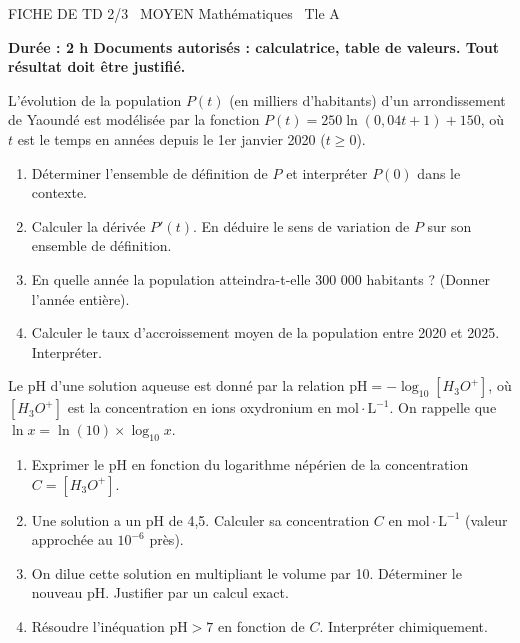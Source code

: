 \documentclass[11pt]{article}
\begin{document}
\begin{tcolorbox}[enhanced,colback=popink,colframe=popink,arc=10pt,boxrule=0pt,left=12pt,right=12pt,top=9pt,bottom=9pt]
{\color{white}\popxbold\small FICHE DE TD 2/3 \textbullet\ MOYEN \hfill Mathématiques \textbullet\ Tle A\par}
\end{tcolorbox}
\vspace{4pt}
\textbf{Durée : 2 h \quad Documents autorisés : calculatrice, table de valeurs. \quad Tout résultat doit être justifié.}

\begin{exercice}
L'évolution de la population $P(t)$ (en milliers d'habitants) d'un arrondissement de Yaoundé est modélisée par la fonction $P(t) = 250 \ln(0,04t + 1) + 150$, où $t$ est le temps en années depuis le 1er janvier 2020 ($t \geq 0$).
\begin{enumerate}
    \item Déterminer l'ensemble de définition de $P$ et interpréter $P(0)$ dans le contexte.
    \item Calculer la dérivée $P'(t)$. En déduire le sens de variation de $P$ sur son ensemble de définition.
    \item En quelle année la population atteindra-t-elle 300 000 habitants ? (Donner l'année entière).
    \item Calculer le taux d'accroissement moyen de la population entre 2020 et 2025. Interpréter.
\end{enumerate}
\end{exercice}

\begin{exercice}
Le pH d'une solution aqueuse est donné par la relation $\text{pH} = -\log_{10}[H_3O^+]$, où $[H_3O^+]$ est la concentration en ions oxydronium en $\text{mol}\cdot\text{L}^{-1}$. On rappelle que $\ln x = \ln(10) \times \log_{10} x$.
\begin{enumerate}
    \item Exprimer le pH en fonction du logarithme népérien de la concentration $C = [H_3O^+]$.
    \item Une solution a un pH de 4,5. Calculer sa concentration $C$ en $\text{mol}\cdot\text{L}^{-1}$ (valeur approchée au $10^{-6}$ près).
    \item On dilue cette solution en multipliant le volume par 10. Déterminer le nouveau pH. Justifier par un calcul exact.
    \item Résoudre l'inéquation $\text{pH} > 7$ en fonction de $C$. Interpréter chimiquement.
\end{enumerate}
\end{exercice}
\end{document}
